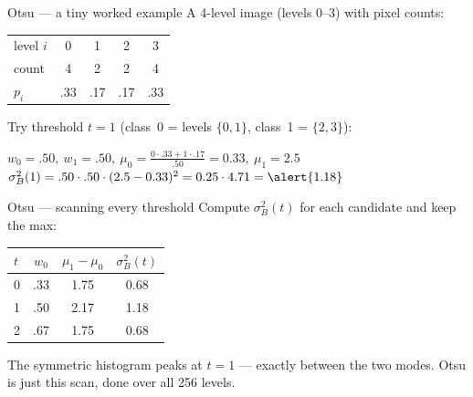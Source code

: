 \documentclass[10pt,aspectratio=169]{beamer}
\begin{document}
\begin{frame}{Otsu --- a tiny worked example}
  A 4-level image (levels 0--3) with pixel counts:
  \begin{center}\small
  \begin{tabular}{lcccc}
    \toprule
    level $i$ & 0 & 1 & 2 & 3\\
    count     & 4 & 2 & 2 & 4\\
    $p_i$     & .33 & .17 & .17 & .33\\
    \bottomrule
  \end{tabular}
  \end{center}
  Try threshold $t=1$ (class~0 = levels $\{0,1\}$, class~1 = $\{2,3\}$):
  \begin{mathbox}
    $w_0=.50,\ w_1=.50,\ \mu_0=\tfrac{0\cdot.33+1\cdot.17}{.50}=0.33,\ \mu_1=2.5$\\[2pt]
    $\sigma_B^2(1)=.50\cdot.50\cdot(2.5-0.33)^2 = 0.25\cdot 4.71 = \alert{1.18}$
  \end{mathbox}
\end{frame}

\begin{frame}{Otsu --- scanning every threshold}
  Compute $\sigma_B^2(t)$ for each candidate and keep the max:
  \begin{center}\small
  \begin{tabular}{lccc}
    \toprule
    $t$ & $w_0$ & $\mu_1-\mu_0$ & $\sigma_B^2(t)$\\
    \midrule
    0 & .33 & 1.75 & 0.68\\
    \alert{1} & .50 & 2.17 & \alert{1.18}\\
    2 & .67 & 1.75 & 0.68\\
    \bottomrule
  \end{tabular}
  \end{center}
  \begin{goodbox}
    The symmetric histogram peaks at $t=1$ --- exactly between the two modes. Otsu is
    just this scan, done over all 256 levels.
  \end{goodbox}
\end{frame}
\end{document}

